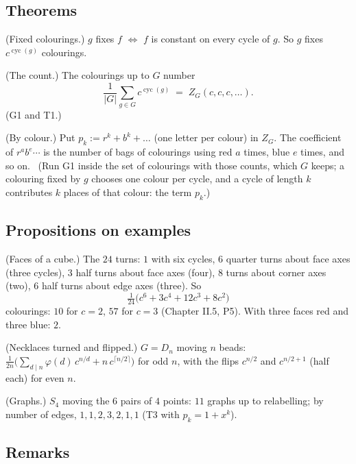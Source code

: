 \subsection*{Theorems}

\begin{lines}
\item[\lab{T1}] (Fixed colourings.) $g$ fixes $f$ $\iff$ $f$ is constant on every cycle of $g$. So $g$ fixes $c^{\operatorname{cyc}(g)}$ colourings.
\item[\lab{T2}] (The count.) The colourings up to $G$ number \[ \frac{1}{|G|} \sum_{g \in G} c^{\operatorname{cyc}(g)} \;=\; Z_G(c, c, c, \dots) . \] (G1 and T1.)
\item[\lab{T3}] (By colour.) Put $p_k := r^k + b^k + \dots$ (one letter per colour) in $Z_G$. The coefficient of $r^{a} b^{e} \cdots$ is the number of bags of colourings using red $a$ times, blue $e$ times, and so on. \ (Run G1 inside the set of colourings with those counts, which $G$ keeps; a colouring fixed by $g$ chooses one colour per cycle, and a cycle of length $k$ contributes $k$ places of that colour: the term $p_k$.)
\end{lines}

\subsection*{Propositions on examples}

\begin{lines}
\item[\lab{P1}] (Faces of a cube.) The $24$ turns: $1$ with six cycles, $6$ quarter turns about face axes (three cycles), $3$ half turns about face axes (four), $8$ turns about corner axes (two), $6$ half turns about edge axes (three). So \[ \tfrac{1}{24}\big(c^6 + 3c^4 + 12c^3 + 8c^2\big) \] colourings: $10$ for $c = 2$, $57$ for $c = 3$ (Chapter II.5, P5). With three faces red and three blue: $2$.
\item[\lab{P2}] (Necklaces turned and flipped.) $G = D_n$ moving $n$ beads: $\frac{1}{2n}\big(\sum_{d \mid n} \varphi(d)\, c^{n/d} + n\,c^{\lceil n/2 \rceil}\big)$ for odd $n$, with the flips $c^{n/2}$ and $c^{n/2+1}$ (half each) for even $n$.
\item[\lab{P3}] (Graphs.) $S_4$ moving the $6$ pairs of $4$ points: $11$ graphs up to relabelling; by number of edges, $1, 1, 2, 3, 2, 1, 1$ (T3 with $p_k = 1 + x^k$).
\end{lines}

\subsection*{Remarks}

